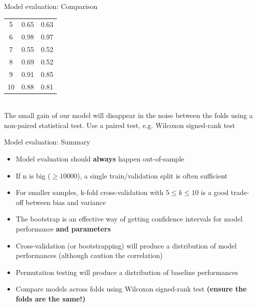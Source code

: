 \documentclass[10pt]{beamer}
\begin{document}
\begin{frame}{Model evaluation: Comparison}
{\begin{center}
\begin{tabular}{|c|c|c|}
                    5 & 0.65 & 0.63 \\
                    6 & 0.98 & 0.97 \\
                    7 & 0.55 & 0.52 \\
                    8 & 0.69 & 0.52 \\
                    9 & 0.91 & 0.85 \\
                    10 & 0.88 & 0.81 \\
                    \hline
                \end{tabular}\\[0.2cm]
                The small gain of our model will disappear in the noise between the folds using a non-paired statistical test. Use a paired test, e.g. Wilcoxon signed-rank test
            \end{center}
        }
    \end{frame}

    \begin{frame}{Model evaluation: Summary}
        \begin{itemize}
            \item Model evaluation should \textbf{always} happen out-of-sample
            \item If n is big ($\geq 10000$), a single train/validation split is often sufficient
            \item For smaller samples, k-fold cross-validation with $5 \leq k \leq 10$ is a good trade-off between bias and variance
            \item The bootstrap is an effective way of getting confidence intervals for model performance \textbf{and parameters}
            \item Cross-validation (or bootstrapping) will produce a distribution of model performances (although caution the correlation)
            \item Permutation testing will produce a distribution of baseline performances
            \item Compare models across folds using Wilcoxon signed-rank test \textbf{(ensure the folds are the same!)}
        \end{itemize}
    \end{frame}

\end{document}

